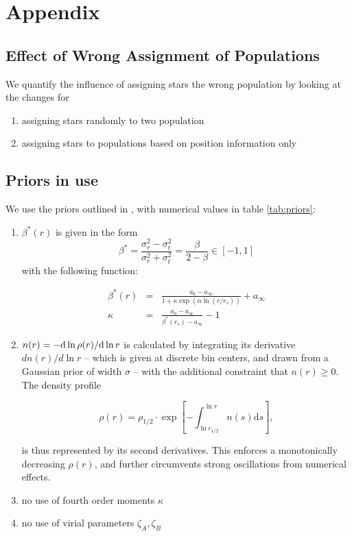 \section{Appendix}

\subsection{Effect of Wrong Assignment of Populations}
We quantify the influence of assigning stars the wrong population by
looking at the changes for

\begin{enumerate}
\item assigning stars randomly to two population
\item assigning stars to populations based on position information
  only
\end{enumerate}


\subsection{Priors in use}
We use the priors outlined in , with numerical
values in table \ref{tab:priors}:

\begin{enumerate}
  \item $\beta^*(r)$ is given in the form
    \begin{equation}\label{eqn:betastar}
      \beta^* = \frac{\sigma_r^2-\sigma_t^2}{\sigma_r^2+\sigma_t^2} = \frac{\beta}{2-\beta} \in [-1,1]
    \end{equation}
    with the following function:

    \begin{eqnarray} \label{eqn:nonparabetstar}
      \beta^*(r) &=& \frac{a_0-a_\infty}{1+\kappa \exp(\alpha\ln(r/r_s))}+a_\infty\\
      \kappa &=& \frac{a_0-a_\infty}{\beta^*(r_s)-a_\infty}-1
    \end{eqnarray}


  \item $n(r)=-{\rm d}\ln\rho(r)/{\rm d}\ln r$ is calculated by integrating its
    derivative $dn(r)/d\ln r$ -- which is given at discrete bin
    centers, and drawn from a Gaussian prior of width $\sigma$ -- with
    the additional constraint that $n(r)\geq0$. The density profile

    \begin{equation*}
      \rho(r) = \rho_{1/2}\cdot\exp\left[-\int_{\ln r_{1/2}}^{\ln r}n(s)\text{d}s\right],
    \end{equation*}

    is thus represented by its second derivatives. This enforces a
    monotonically decreasing $\rho(r)$, and further circumvents strong
    oscillations from numerical effects.

  \item no use of fourth order moments $\kappa$
  \item no use of virial parameters $\zeta_A, \zeta_B$
\end{enumerate}



